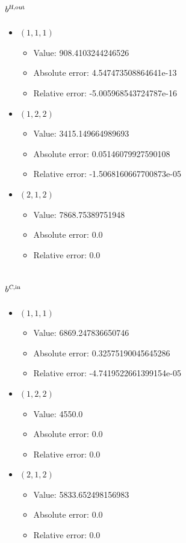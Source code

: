 \documentclass{article}%
\begin{document}
\subsection{$b^{\textsl{H},\text{out}}$}%
\begin{itemize}%
	\item $(1, 1, 1)$%
	\begin{itemize}%
		\item Value: 908.4103244246526%
		\item Absolute error: 4.547473508864641e-13%
		\item Relative error: -5.005968543724787e-16%
	\end{itemize}%
	\item $(1, 2, 2)$%
	\begin{itemize}%
		\item Value: 3415.149664989693%
		\item Absolute error: 0.05146079927590108%
		\item Relative error: -1.5068160667700873e-05%
	\end{itemize}%
	\item $(2, 1, 2)$%
	\begin{itemize}%
		\item Value: 7868.75389751948%
		\item Absolute error: 0.0%
		\item Relative error: 0.0%
	\end{itemize}%
\end{itemize}%
\subsection{$b^{\textsl{C},\text{in}}$}%
\begin{itemize}%
	\item $(1, 1, 1)$%
	\begin{itemize}%
		\item Value: 6869.247836650746%
		\item Absolute error: 0.32575190045645286%
		\item Relative error: -4.7419522661399154e-05%
	\end{itemize}%
	\item $(1, 2, 2)$%
	\begin{itemize}%
		\item Value: 4550.0%
		\item Absolute error: 0.0%
		\item Relative error: 0.0%
	\end{itemize}%
	\item $(2, 1, 2)$%
	\begin{itemize}%
		\item Value: 5833.652498156983%
		\item Absolute error: 0.0%
		\item Relative error: 0.0%
	\end{itemize}%
\end{itemize}%
\end{document}
